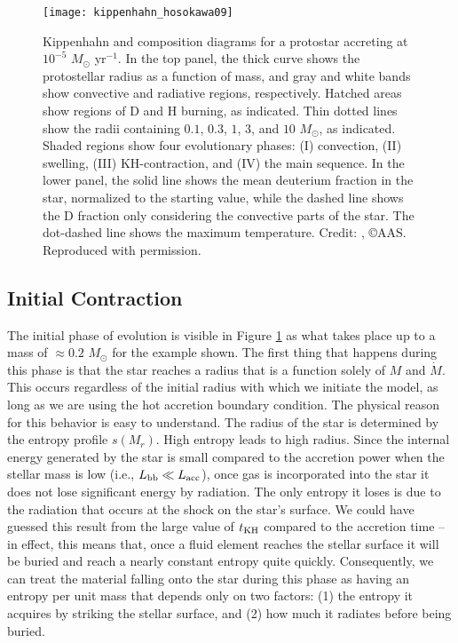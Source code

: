 \begin{figure}
\texttt{[image: kippenhahn\_hosokawa09]}
\caption[Kippenhahn diagram for an accretion protostar]{
\label{fig:kippenhahn_hosokawa09}
Kippenhahn and composition diagrams for a protostar accreting at $10^{-5}$ $M_\odot$ yr$^{-1}$. In the top panel, the thick curve shows the protostellar radius as a function of mass, and gray and white bands show convective and radiative regions, respectively. Hatched areas show regions of D and H burning, as indicated. Thin dotted lines show the radii containing $0.1$, $0.3$, $1$, $3$, and $10$ $M_\odot$, as indicated. Shaded regions show four evolutionary phases: (I) convection, (II) swelling, (III) KH-contraction, and (IV) the main sequence. In the lower panel, the solid line shows the mean deuterium fraction in the star, normalized to the starting value, while the dashed line shows the D fraction only considering the convective parts of the star. The dot-dashed line shows the maximum temperature. Credit: \citet{hosokawa09a}, \copyright AAS. Reproduced with permission.
}
\end{figure}

\subsection{Initial Contraction}

The initial phase of evolution is visible in Figure \ref{fig:kippenhahn_hosokawa09} as what takes place up to a mass of $\approx 0.2$ $M_\odot$ for the example shown. The first thing that happens during this phase is that the star reaches a radius that is a function solely of $M$ and $\dot{M}$. This occurs regardless of the initial radius with which we initiate the model, as long as we are using the hot accretion boundary condition. The physical reason for this behavior is easy to understand. The radius of the star is determined by the entropy profile $s(M_r)$. High entropy leads to high radius. Since the internal energy generated by the star is small compared to the accretion power when the stellar mass is low (i.e., $L_{\rm bb} \ll L_{\rm acc}$), once gas is incorporated into the star it does not lose significant energy by radiation. The only entropy it loses is due to the radiation that occurs at the shock on the star's surface. We could have guessed this result from the large value of $t_{\rm KH}$ compared to the accretion time -- in effect, this means that, once a fluid element reaches the stellar surface it will be buried and reach a nearly constant entropy quite quickly. Consequently, we can treat the material falling onto the star during this phase as having an entropy per unit mass that depends only on two factors: (1) the entropy it acquires by striking the stellar surface, and (2) how much it radiates before being buried.

